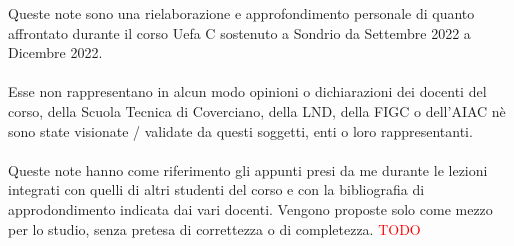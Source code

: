 Queste note sono una rielaborazione e approfondimento personale di quanto affrontato durante il corso Uefa C sostenuto a Sondrio da Settembre 2022 a Dicembre 2022. \hfill \\ \hfill \\
Esse non rappresentano in alcun modo opinioni o dichiarazioni dei docenti del corso, della Scuola Tecnica di Coverciano, della LND, della FIGC o dell'AIAC nè sono state visionate / validate da questi soggetti, enti o loro rappresentanti. \hfill \\ \hfill \\
Queste note hanno come riferimento gli appunti presi da me durante le lezioni integrati con quelli di altri studenti del corso e con la bibliografia di approdondimento indicata dai vari docenti. Vengono proposte solo come mezzo per lo studio, senza pretesa di correttezza o di completezza.
\textcolor{red}{TODO}
